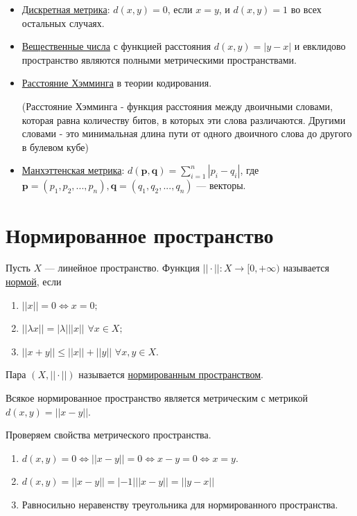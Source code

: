     \begin{example}
    	\begin{itemize}
    		\item \underline{Дискретная метрика}: $d(x, y) = 0$, если $x = y$, и $d(x, y) = 1$ во всех остальных случаях.
    		\item \underline{Вещественные числа} с функцией расстояния $d(x, y) = |y - x|$ и евклидово пространство являются полными метрическими пространствами.
    		\item \underline{Расстояние Хэмминга} в теории кодирования.
    		
    		(Расстояние Хэмминга - функция расстояния между двоичными словами, которая равна количеству битов, в которых эти слова различаются. Другими словами - это минимальная длина пути от одного двоичного слова до другого в булевом кубе)
    		\item \underline{Манхэттенская метрика}: $d(\textbf{p}, \textbf{q}) = \sum^n_{i = 1} |p_i - q_i|$,
    		где $\textbf{p} = (p_1, p_2, ..., p_n), \textbf{q} = (q_1, q_2, ..., q_n)$ — векторы.
    	\end{itemize}
    \end{example}
    
    \section{Нормированное пространство}
    
    \begin{definition}
    	Пусть $X$ — линейное пространство. Функция
    	$||\cdot||: X \rightarrow [0, +\infty)$ называется \underline{нормой}, если
    	\begin{enumerate}
    		\item $||x|| = 0 \Leftrightarrow x = 0;$
    		\item $||\lambda x|| = |\lambda| ||x||$ $\forall x \in X;$
    		\item $||x + y|| \leqslant ||x|| + ||y||$ $\forall x, y \in X.$
    	\end{enumerate}
    	Пара $(X, ||\cdot||)$ называется \underline{нормированным пространством}.
    \end{definition}
    Всякое нормированное пространство является метрическим с метрикой $d(x, y) = ||x - y||$.
    
    Проверяем свойства метрического пространства.
    \begin{enumerate}
    	\item $d(x, y) = 0 \Leftrightarrow ||x - y|| = 0 \Leftrightarrow x - y = 0 \Leftrightarrow x = y.$
    	\item $d(x, y) = ||x - y|| = |-1|||x - y|| = ||y - x||$
    	\item Равносильно неравенству треугольника для нормированного пространства.
    \end{enumerate}
    
